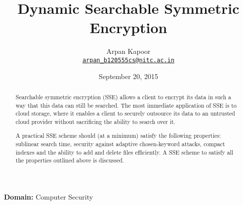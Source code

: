 \documentclass[12pt,a4paper]{article}
\begin{document}
\title{Dynamic Searchable Symmetric Encryption}
\author{Arpan Kapoor\\
	\href{mailto:arpan_b120555cs@nitc.ac.in}
	{\nolinkurl{arpan_b120555cs@nitc.ac.in}}
}
\date{September 20, 2015}

\maketitle

\begin{center}
	\textbf{Domain:} Computer Security
\end{center}

\begin{abstract}
Searchable symmetric encryption (SSE) allows a client to encrypt its data in
such a way that this data can still be searched. The most immediate application
of SSE is to cloud storage, where it enables a client to securely outsource its
data to an untrusted cloud provider without sacrificing the ability to search
over it.

A practical SSE scheme should (at a minimum) satisfy the following properties:
sublinear search time, security against adaptive chosen-keyword attacks,
compact indexes and the ability to add and delete files efficiently.
A SSE scheme to satisfy all the properties outlined above is discussed.
\end{abstract}

\nocite{*}
\printbibliography
\end{document}
